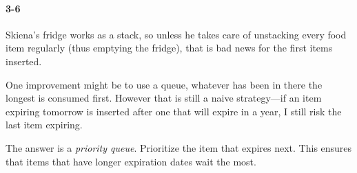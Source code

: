\documentclass{report}
\begin{document}
\paragraph{3-6}Skiena's fridge works as a stack, so unless he takes care of unstacking every food item regularly (thus emptying the fridge), that is bad news for the first items inserted.

One improvement might be to use a queue, whatever has been in there the longest is consumed first. However that is still a naive strategy---if an item expiring tomorrow is inserted after one that will expire in a year, I still risk the last item expiring.

The answer is a \emph{priority queue}. Prioritize the item that expires next. This ensures that items that have longer expiration dates wait the most.
\end{document}
